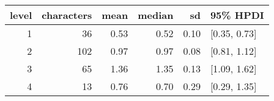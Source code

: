 
\begin{tabular}[t]{rrrrrl}
\toprule
level & characters & mean & median & sd & 95\% HPDI\\
\midrule
1 & 36 & 0.53 & 0.52 & 0.10 & {}[0.35, 0.73]\\
2 & 102 & 0.97 & 0.97 & 0.08 & {}[0.81, 1.12]\\
3 & 65 & 1.36 & 1.35 & 0.13 & {}[1.09, 1.62]\\
4 & 13 & 0.76 & 0.70 & 0.29 & {}[0.29, 1.35]\\
\bottomrule
\end{tabular}
